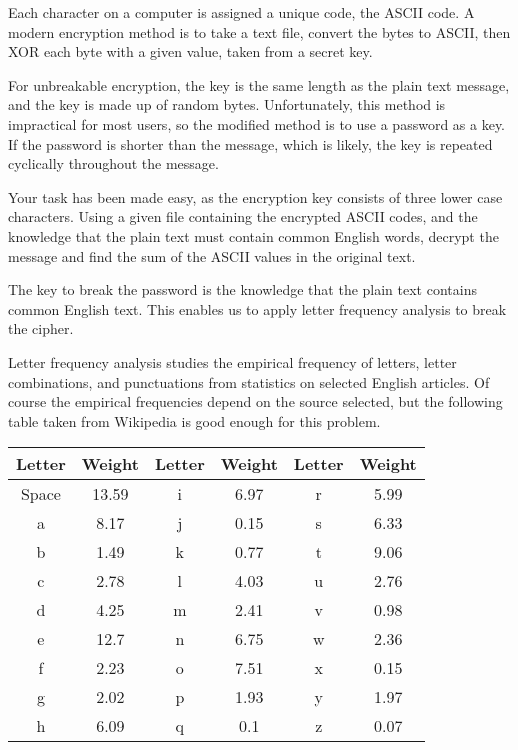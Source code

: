




Each character on a computer is assigned a unique code, the ASCII code. A modern encryption method is to take a text file, convert the bytes to ASCII, then XOR each byte with a given value, taken from a secret key.

For unbreakable encryption, the key is the same length as the plain text message, and the key is made up of random bytes. Unfortunately, this method is impractical for most users, so the modified method is to use a password as a key. If the password is shorter than the message, which is likely, the key is repeated cyclically throughout the message.

Your task has been made easy, as the encryption key consists of three lower case characters. Using a given file containing the encrypted ASCII codes, and the knowledge that the plain text must contain common English words, decrypt the message and find the sum of the ASCII values in the original text.

\solution

The key to break the password is the knowledge that the plain text contains common English text. This enables us to apply letter frequency analysis to break the cipher.

Letter frequency analysis studies the empirical frequency of letters, letter combinations, and punctuations from statistics on selected English articles. Of course the empirical frequencies depend on the source selected, but the following table taken from Wikipedia is good enough for this problem.
\begin{center}
\begin{tabular}{c c | c c | c c}
\hline
Letter & Weight & Letter & Weight & Letter & Weight \\
\hline
Space & 13.59 & i &	6.97 & r & 5.99 \\
a & 8.17 & j & 0.15 & s & 6.33 \\
b & 1.49 & k & 0.77 & t & 9.06 \\
c & 2.78 & l & 4.03 & u & 2.76 \\
d & 4.25 & m & 2.41 & v & 0.98 \\
e & 12.7 & n & 6.75 & w & 2.36 \\
f & 2.23 & o & 7.51 & x & 0.15 \\
g & 2.02 & p & 1.93 & y & 1.97 \\
h & 6.09 & q & 0.1 & z & 0.07 \\
\hline
\end{tabular}
\end{center}


